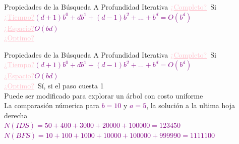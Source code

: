 \documentclass{beamer}
\theoremstyle{definition}
\theoremstyle{theorem}
\theoremstyle{remark}
\begin{document}
\begin{frame}{Propiedades de la Búsqueda A Profundidad Iterativa}
    \small{ 
        \textcolor{Pink}{\underline{¿Completo?}}\, Si
        \\
        \textcolor{Pink}{\underline{¿Tiempo?}}\;\textcolor{Purple}{$(d+ 1)b^0+db^1+ (d-1)b^2 + ... + b^d= O(b^d)$}
        \\
        \textcolor{Pink}{\underline{¿Espacio?}}\;\textcolor{Purple}{$O(bd)$}
        \\
        \textcolor{Pink}{\underline{¿Optimo?}}\,
        \\
    }
\end{frame}


\begin{frame}{Propiedades de la Búsqueda A Profundidad Iterativa}
    \small{ 
        \textcolor{Pink}{\underline{¿Completo?}}\, Si
        \\
        \textcolor{Pink}{\underline{¿Tiempo?}}\;\textcolor{Purple}{$(d+ 1)b^0+db^1+ (d-1)b^2 + ... + b^d= O(b^d)$}
        \\
        \textcolor{Pink}{\underline{¿Espacio?}}\;\textcolor{Purple}{$O(bd)$}
        \\
        \textcolor{Pink}{\underline{¿Optimo?}}\, Sí, si el paso cuesta 1 
        \\
        Puede ser modificado para explorar un árbol con costo uniforme
        \\
        La comparasión númerica para \textcolor{Purple}{$b = 10$} y \textcolor{Purple}{$a = 5$}, la solución a la ultima hoja derecha
        \\
        \textcolor{Purple}{$N(IDS) = 50 + 400 + 3000 + 20000 + 100000 = 123450$}
        \\
        \textcolor{Purple}{$N(BFS) = 10 + 100 + 1000 + 10000 + 100000 + 999990 = 1111100$}
    }
\end{frame}
\end{document}
